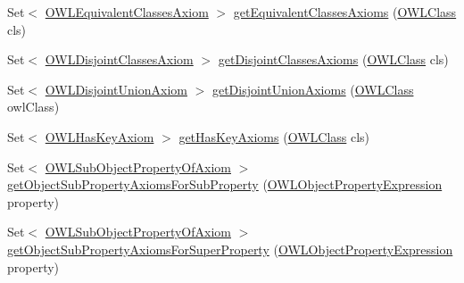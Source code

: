 \begin{DoxyCompactItemize}
Set$<$ \hyperlink{interfaceorg_1_1semanticweb_1_1owlapi_1_1model_1_1_o_w_l_equivalent_classes_axiom}{O\-W\-L\-Equivalent\-Classes\-Axiom} $>$ \hyperlink{classuk_1_1ac_1_1manchester_1_1cs_1_1owl_1_1owlapi_1_1_o_w_l_ontology_impl_a65e005ffce5b9fc6be30f8045a06e888}{get\-Equivalent\-Classes\-Axioms} (\hyperlink{interfaceorg_1_1semanticweb_1_1owlapi_1_1model_1_1_o_w_l_class}{O\-W\-L\-Class} cls)
\item 
Set$<$ \hyperlink{interfaceorg_1_1semanticweb_1_1owlapi_1_1model_1_1_o_w_l_disjoint_classes_axiom}{O\-W\-L\-Disjoint\-Classes\-Axiom} $>$ \hyperlink{classuk_1_1ac_1_1manchester_1_1cs_1_1owl_1_1owlapi_1_1_o_w_l_ontology_impl_a6326cc5f788b658cd4427375eb58e003}{get\-Disjoint\-Classes\-Axioms} (\hyperlink{interfaceorg_1_1semanticweb_1_1owlapi_1_1model_1_1_o_w_l_class}{O\-W\-L\-Class} cls)
\item 
Set$<$ \hyperlink{interfaceorg_1_1semanticweb_1_1owlapi_1_1model_1_1_o_w_l_disjoint_union_axiom}{O\-W\-L\-Disjoint\-Union\-Axiom} $>$ \hyperlink{classuk_1_1ac_1_1manchester_1_1cs_1_1owl_1_1owlapi_1_1_o_w_l_ontology_impl_a7eb974068ac16bdeedcb5da493381d2f}{get\-Disjoint\-Union\-Axioms} (\hyperlink{interfaceorg_1_1semanticweb_1_1owlapi_1_1model_1_1_o_w_l_class}{O\-W\-L\-Class} owl\-Class)
\item 
Set$<$ \hyperlink{interfaceorg_1_1semanticweb_1_1owlapi_1_1model_1_1_o_w_l_has_key_axiom}{O\-W\-L\-Has\-Key\-Axiom} $>$ \hyperlink{classuk_1_1ac_1_1manchester_1_1cs_1_1owl_1_1owlapi_1_1_o_w_l_ontology_impl_a123cf268776be380f87a32a7ff47def4}{get\-Has\-Key\-Axioms} (\hyperlink{interfaceorg_1_1semanticweb_1_1owlapi_1_1model_1_1_o_w_l_class}{O\-W\-L\-Class} cls)
\item 
Set$<$ \hyperlink{interfaceorg_1_1semanticweb_1_1owlapi_1_1model_1_1_o_w_l_sub_object_property_of_axiom}{O\-W\-L\-Sub\-Object\-Property\-Of\-Axiom} $>$ \hyperlink{classuk_1_1ac_1_1manchester_1_1cs_1_1owl_1_1owlapi_1_1_o_w_l_ontology_impl_aad9262b34bc59b7904e86fa954738296}{get\-Object\-Sub\-Property\-Axioms\-For\-Sub\-Property} (\hyperlink{interfaceorg_1_1semanticweb_1_1owlapi_1_1model_1_1_o_w_l_object_property_expression}{O\-W\-L\-Object\-Property\-Expression} property)
\item 
Set$<$ \hyperlink{interfaceorg_1_1semanticweb_1_1owlapi_1_1model_1_1_o_w_l_sub_object_property_of_axiom}{O\-W\-L\-Sub\-Object\-Property\-Of\-Axiom} $>$ \hyperlink{classuk_1_1ac_1_1manchester_1_1cs_1_1owl_1_1owlapi_1_1_o_w_l_ontology_impl_a25c68719b25e502943a78bba4162167c}{get\-Object\-Sub\-Property\-Axioms\-For\-Super\-Property} (\hyperlink{interfaceorg_1_1semanticweb_1_1owlapi_1_1model_1_1_o_w_l_object_property_expression}{O\-W\-L\-Object\-Property\-Expression} property)

\end{DoxyCompactItemize}
